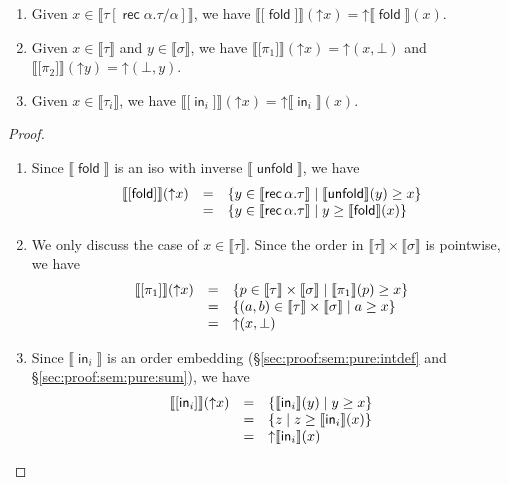 \documentclass[%
  a4paper,
  UKenglish,
  cleveref,
  autoref,
  thm-restate,
  numberwithinsect,
]{lipics-v2021}
\newcommand\up{\mathord{\uparrow}}
\newcommand\I[1]{\llbracket #1 \rrbracket} %
\newcommand\term[1]{\mathsf{#1}}
\newcommand\type[1]{\term{#1}}
\newcommand\inj{\mathop{\term{in}}}
\newcommand\fold{\mathop{\term{fold}}}
\newcommand\unfold{\mathop{\term{unfold}}}
\newcommand\rec{\mathop{\type{rec}}}	%
\newcommand\TV{\alpha}		%
\newcommand\PT{\tau}		%
\newcommand\PTbis{\sigma}	%
\newcommand\form[1]{\lbrack #1 \rbrack}
\begin{document}
\begin{lemma}
\label{lem:proof:sem:log:mod:upset}
\hfill
\begin{enumerate}[(1)]
\item
Given $x \in \I{\PT[\rec \TV.\PT / \TV]}$,
we have
$\I{\form\fold}(\up x) = \up \I\fold(x)$.

\item
Given $x \in \I{\PT}$ and $y \in \I{\PTbis}$,
we have
$\I{\form{\pi_1}}(\up x) = \up (x, \bot)$
and
$\I{\form{\pi_2}}(\up y) = \up (\bot, y)$.

\item
Given $x \in \I{\PT_i}$,
we have
$\I{\form{\inj_i}}(\up x) = \up \I{\inj_i}(x)$.
\end{enumerate}
\end{lemma}

\begin{proof}
\hfill
\begin{enumerate}[(1)]
\item
Since $\I\fold$ is an iso with inverse $\I\unfold$, we have
\[
\begin{array}{l l l}
  \I{\form\fold}(\up x)
& =
& \left\{
  y \in \I{\rec \TV.\PT}
  \mid
  \I\unfold(y) \geq x
  \right\}
\\
%
& =
& \left\{
  y \in \I{\rec \TV.\PT}
  \mid
  y \geq \I\fold(x)
  \right\}
\end{array}
\]

\item
We only discuss the case of $x \in \I\PT$.
Since the order in $\I\PT \times \I\PTbis$ is pointwise,
we have
\[
\begin{array}{l l l}
  \I{\form{\pi_1}}(\up x)
& =
& \left\{
  p \in \I\PT \times \I\PTbis
  \mid
  \I{\pi_1}(p) \geq x
  \right\}
\\
%
& =
& \left\{
  (a,b) \in \I\PT \times \I\PTbis
  \mid
  a \geq x
  \right\}
\\
%
& =
& \up(x, \bot)
\end{array}
\]

\item
Since $\I{\inj_i}$ is an order embedding
(\S\ref{sec:proof:sem:pure:intdef} and \S\ref{sec:proof:sem:pure:sum}),
we have
\[
\begin{array}{l l l}
  \I{\form{\inj_i}}(\up x)
& =
& \left\{
  \I{\inj_i}(y)
  \mid
  y \geq x
  \right\}
\\
%
& =
& \left\{
  z
  \mid
  z \geq \I{\inj_i}(x)
  \right\}
\\
%
& =
& \up \I{\inj_i}(x)
\end{array}
\]
\qedhere
\end{enumerate}
\end{proof}
\end{document}
